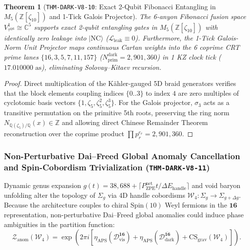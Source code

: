 \documentclass[11pt,onecolumn]{article}
\newtheorem{theorem}{Theorem}
\begin{document}
\begin{theorem}[{\texttt{THM-DARK-V8-10}: Exact 2-Qubit Fibonacci Entangling in $M_5(\mathbb{Z}[\zeta_{10}])$ and 1-Tick Galois Projector}]
\label{thm:dark_v8_10}
The 6-anyon Fibonacci fusion space $V_{\tau^{\otimes 6}}^1 \cong \mathbb{C}^5$ supports exact 2-qubit entangling gates in $M_5(\mathbb{Z}[\zeta_{10}])$ with identically zero leakage into $|\text{NC}\rangle$ ($\mathcal{L}_{\text{leak}} \equiv 0$). Furthermore, the 1-Tick Galois-Norm Unit Projector maps continuous Cartan weights into the 6 coprime CRT prime lanes $\{16, 3, 5, 7, 11, 157\}$ ($N_{\text{prim}}^{\text{dark}} = 2{,}901{,}360$) in 1 KZ clock tick ($17.010000\text{ as}$), eliminating Solovay--Kitaev recursion.
\end{theorem}

\begin{proof}
Direct multiplication of the K\"ahler-gauged 5D braid generators verifies that the block elements coupling indices $\{0..3\}$ to index $4$ are zero multiples of cyclotomic basis vectors $\{1, \zeta_5, \zeta_5^2, \zeta_5^3\}$. For the Galois projector, $\sigma_3$ acts as a transitive permutation on the primitive 5th roots, preserving the ring norm $N_{\mathbb{Q}(\zeta_5)/\mathbb{Q}}(x) \in \mathbb{Z}$ and allowing direct Chinese Remainder Theorem reconstruction over the coprime product $\prod p_r^{e_r} = 2{,}901{,}360$.
\end{proof}

\subsubsection{Non-Perturbative Dai--Freed Global Anomaly Cancellation and Spin-Cobordism Trivialization (\texttt{THM-DARK-V8-11})}
\label{subsubsec:thm_dark_v8_11}

Dynamic genus expansion $g(t) = 38{,}688 + \lceil P_{\text{ZPE}}^{\text{net}} t / \Delta E_{\text{handle}}\rceil$ and void baryon unfolding alter the topology of $\Sigma_g$ via 4D handle cobordisms $\mathcal{W}_4: \Sigma_g \to \Sigma_{g+\Delta g}$. Because the architecture couples to chiral $\text{Spin}(10)$ Weyl fermions in the $\mathbf{16}$ representation, non-perturbative Dai--Freed global anomalies could induce phase ambiguities in the partition function:
\begin{equation}
\mathcal{Z}_{\text{anom}}(\mathcal{W}_4) = \exp\left(2\pi i \left[\eta_{\text{APS}}(\mathcal{D}_{\text{vis}}^{\mathbf{16}}) + \eta_{\text{APS}}(\mathcal{D}_{\text{dark}}^{\overline{\mathbf{16}}}) + \text{CS}_{\text{grav}}(\mathcal{W}_4)\right]\right).
\label{eq:v8_48}
\end{equation}
\end{document}
